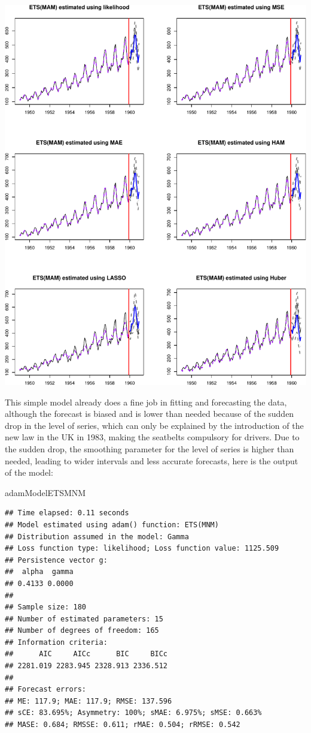 \documentclass[
]{book}
\newenvironment{Shaded}{\begin{snugshade}}{\end{snugshade}}
\newcommand{\NormalTok}[1]{#1}
\theoremstyle{definition}
\theoremstyle{definition}
\theoremstyle{definition}
\theoremstyle{definition}
\theoremstyle{remark}
\begin{document}
\includegraphics{adam_files/figure-latex/unnamed-chunk-73-1.pdf}

This simple model already does a fine job in fitting and forecasting the data, although the forecast is biased and is lower than needed because of the sudden drop in the level of series, which can only be explained by the introduction of the new law in the UK in 1983, making the seatbelts compulsory for drivers. Due to the sudden drop, the smoothing parameter for the level of series is higher than needed, leading to wider intervals and less accurate forecasts, here is the output of the model:

\begin{Shaded}
\begin{Highlighting}[]
\NormalTok{adamModelETSMNM}
\end{Highlighting}
\end{Shaded}

\begin{verbatim}
## Time elapsed: 0.11 seconds
## Model estimated using adam() function: ETS(MNM)
## Distribution assumed in the model: Gamma
## Loss function type: likelihood; Loss function value: 1125.509
## Persistence vector g:
##  alpha  gamma 
## 0.4133 0.0000 
## 
## Sample size: 180
## Number of estimated parameters: 15
## Number of degrees of freedom: 165
## Information criteria:
##      AIC     AICc      BIC     BICc 
## 2281.019 2283.945 2328.913 2336.512 
## 
## Forecast errors:
## ME: 117.9; MAE: 117.9; RMSE: 137.596
## sCE: 83.695%; Asymmetry: 100%; sMAE: 6.975%; sMSE: 0.663%
## MASE: 0.684; RMSSE: 0.611; rMAE: 0.504; rRMSE: 0.542
\end{verbatim}
\end{document}
